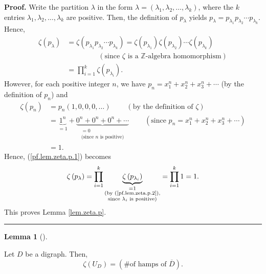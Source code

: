\documentclass[numbers=enddot,12pt,final,onecolumn,notitlepage]{scrartcl}%
\numberwithin{exer}{section}
\theoremstyle{definition}
\newtheorem{lem}[theo]{Lemma}
\newenvironment{lemma}[1][]
{\begin{lem}[#1]\begin{leftbar}}
{\end{leftbar}\end{lem}}
\newenvironment{proof}[1][Proof]{\noindent\textbf{#1.} }{\ \rule{0.5em}{0.5em}}
\let\prodnonlimits\prod
\renewcommand{\prod}{\prodnonlimits\limits}
\begin{document}
\begin{proof}
Write the partition $\lambda$ in the form $\lambda=\left(  \lambda_{1}%
,\lambda_{2},\ldots,\lambda_{k}\right)  $, where the $k$ entries $\lambda
_{1},\lambda_{2},\ldots,\lambda_{k}$ are positive. Then, the definition of
$p_{\lambda}$ yields $p_{\lambda}=p_{\lambda_{1}}p_{\lambda_{2}}\cdots
p_{\lambda_{k}}$. Hence,%
\begin{align}
\zeta\left(  p_{\lambda}\right)   &  =\zeta\left(  p_{\lambda_{1}}%
p_{\lambda_{2}}\cdots p_{\lambda_{k}}\right)  =\zeta\left(  p_{\lambda_{1}%
}\right)  \zeta\left(  p_{\lambda_{2}}\right)  \cdots\zeta\left(
p_{\lambda_{k}}\right) \nonumber\\
&  \ \ \ \ \ \ \ \ \ \ \ \ \ \ \ \ \ \ \ \ \left(  \text{since }\zeta\text{ is
a }\mathbb{Z}\text{-algebra homomorphism}\right) \nonumber\\
&  =\prod_{i=1}^{k}\zeta\left(  p_{\lambda_{i}}\right)  .
\label{pf.lem.zeta.p.1}%
\end{align}
However, for each positive integer $n$, we have $p_{n}=x_{1}^{n}+x_{2}%
^{n}+x_{3}^{n}+\cdots$ (by the definition of $p_{n}$) and%
\begin{align}
\zeta\left(  p_{n}\right)   &  =p_{n}\left(  1,0,0,0,\ldots\right)
\ \ \ \ \ \ \ \ \ \ \left(  \text{by the definition of }\zeta\right)
\nonumber\\
&  =\underbrace{1^{n}}_{=1}+\underbrace{0^{n}+0^{n}+0^{n}+\cdots
}_{\substack{=0\\\text{(since }n\text{ is positive)}}%
}\ \ \ \ \ \ \ \ \ \ \left(  \text{since }p_{n}=x_{1}^{n}+x_{2}^{n}+x_{3}%
^{n}+\cdots\right) \nonumber\\
&  =1. \label{pf.lem.zeta.p.2}%
\end{align}
Hence, (\ref{pf.lem.zeta.p.1}) becomes%
\[
\zeta\left(  p_{\lambda}\right)  =\prod_{i=1}^{k}\underbrace{\zeta\left(
p_{\lambda_{i}}\right)  }_{\substack{=1\\\text{(by (\ref{pf.lem.zeta.p.2}%
),}\\\text{since }\lambda_{i}\text{ is positive)}}}=\prod_{i=1}^{k}1=1.
\]
This proves Lemma \ref{lem.zeta.p}.
\end{proof}

\begin{lemma}
\label{lem.zeta.U}Let $D$ be a digraph. Then,%
\[
\zeta\left(  U_{D}\right)  =\left(  \text{\# of hamps of }\overline{D}\right)
.
\]

\end{lemma}
\end{document}
